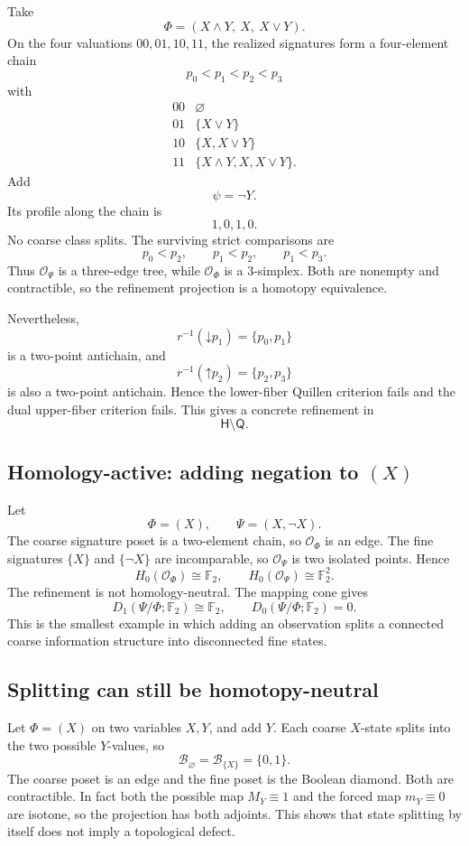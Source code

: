 \documentclass[11pt]{article}
\theoremstyle{definition}
\newcommand{\F}{\mathbb F_2}
\newcommand{\OX}{\mathcal O}
\newcommand{\down}{\mathord\downarrow}
\newcommand{\up}{\mathord\uparrow}
\begin{document}
Take
\[
\Phi=(X\wedge Y,\ X,\ X\vee Y).
\]
On the four valuations \(00,01,10,11\), the realized signatures form a four-element chain
\[
p_0<p_1<p_2<p_3
\]
with
\[
\begin{array}{c|c}
00&\varnothing\\
01&\{X\vee Y\}\\
10&\{X,X\vee Y\}\\
11&\{X\wedge Y,X,X\vee Y\}.
\end{array}
\]
Add
\[
\psi=\neg Y.
\]
Its profile along the chain is
\[
1,0,1,0.
\]
No coarse class splits. The surviving strict comparisons are
\[
p_0<p_2,
\qquad
p_1<p_2,
\qquad
p_1<p_3.
\]
Thus \(\OX_\Psi\) is a three-edge tree, while \(\OX_\Phi\) is a \(3\)-simplex. Both are nonempty and contractible, so the refinement projection is a homotopy equivalence.

Nevertheless,
\[
r^{-1}(\down p_1)=\{p_0,p_1\}
\]
is a two-point antichain, and
\[
r^{-1}(\up p_2)=\{p_2,p_3\}
\]
is also a two-point antichain. Hence the lower-fiber Quillen criterion fails and the dual upper-fiber criterion fails. This gives a concrete refinement in
\[
\mathsf H\setminus\mathsf Q.
\]

\subsection{Homology-active: adding negation to \((X)\)}

Let
\[
\Phi=(X),\qquad \Psi=(X,\neg X).
\]
The coarse signature poset is a two-element chain, so \(\OX_\Phi\) is an edge. The fine signatures \(\{X\}\) and \(\{\neg X\}\) are incomparable, so \(\OX_\Psi\) is two isolated points. Hence
\[
H_0(\OX_\Phi)\cong\F,
\qquad
H_0(\OX_\Psi)\cong\F^2.
\]
The refinement is not homology-neutral. The mapping cone gives
\[
D_1(\Psi/\Phi;\F)\cong\F,
\qquad D_0(\Psi/\Phi;\F)=0.
\]
This is the smallest example in which adding an observation splits a connected coarse information structure into disconnected fine states.

\subsection{Splitting can still be homotopy-neutral}

Let \(\Phi=(X)\) on two variables \(X,Y\), and add \(Y\). Each coarse \(X\)-state splits into the two possible \(Y\)-values, so
\[
\mathcal B_{\varnothing}=\mathcal B_{\{X\}}=\{0,1\}.
\]
The coarse poset is an edge and the fine poset is the Boolean diamond. Both are contractible. In fact both the possible map \(M_Y\equiv1\) and the forced map \(m_Y\equiv0\) are isotone, so the projection has both adjoints. This shows that state splitting by itself does not imply a topological defect.
\end{document}
